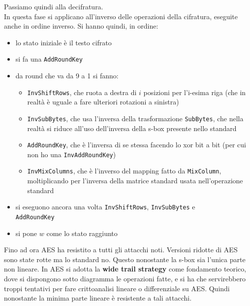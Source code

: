 \documentclass[a4paper,12pt, oneside]{book}
\begin{document}
Passiamo quindi alla decifratura.\\
In questa fase si applicano all'inverso delle operazioni della cifratura,
eseguite anche in ordine inverso. Si hanno quindi, in ordine:
\begin{itemize}
  \item lo stato iniziale è il testo cifrato
  \item si fa una \texttt{AddRoundKey}
  \item da round che va da 9 a 1 si fanno:
  \begin{itemize}
    \item \texttt{InvShiftRows}, che ruota a destra di $i$ posizioni per
    l'i-esima riga (che in realtà è uguale a fare ulteriori rotazioni a
    sinistra) 
    \item \texttt{InvSubBytes}, che usa l'inversa della trasformazione
    \texttt{SubBytes}, che nella realtà si riduce all'uso dell'inversa della
    s-box presente nello standard
    \item \texttt{AddRoundKey}, che è l'inversa di se stessa facendo lo xor bit
    a bit (per cui non ho una \texttt{InvAddRoundKey})
    \item \texttt{InvMixColumns}, che è l'inverso del mapping fatto da
    \texttt{MixColumn}, moltiplicando per l'inversa della matrice standard usata
    nell'operazione standard 
  \end{itemize}
  \item si eseguono ancora una volta \texttt{InvShiftRows}, \texttt{InvSubBytes}
  e \\\texttt{AddRoundKey}
  \item si pone $w$ come lo stato raggiunto 
\end{itemize}
Fino ad ora AES ha resistito a tutti gli attacchi noti. Versioni ridotte di AES
sono state rotte ma lo standard no. Questo nonostante la s-box sia l'unica parte
non lineare. In AES si adotta la \textbf{wide trail strategy} come fondamento
teorico, dove si dispongono sotto diagramma le operazioni fatte, e si ha che
servirebbero troppi tentativi per fare crittoanalisi lineare o differenziale su
AES. Quindi nonostante la minima parte lineare è resistente a tali
attacchi.  \\
\end{document}
